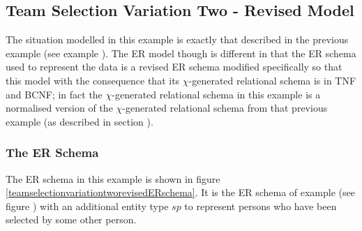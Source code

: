\subsection{Team Selection Variation Two - Revised Model}

The situation modelled in this example is exactly that described in the previous example (see example ). 
The ER model though is different in that the ER schema used to represent the data  is a revised ER schema modified specifically so that  this model  with the consequence that its $\chi$-generated relational schema is in TNF and BCNF;  in fact the $\chi$-generated relational schema in this example is a normalised version of the $\chi$-generated relational schema from that 
previous example (as described in section ).

\subsubsection{The ER Schema}
The ER schema in this example is shown in figure \ref{teamselectionvariationtworevisedERschema}. It is the ER schema of example  (see figure 
) with an additional entity type $sp$ to represent persons who have been selected by some other person.


